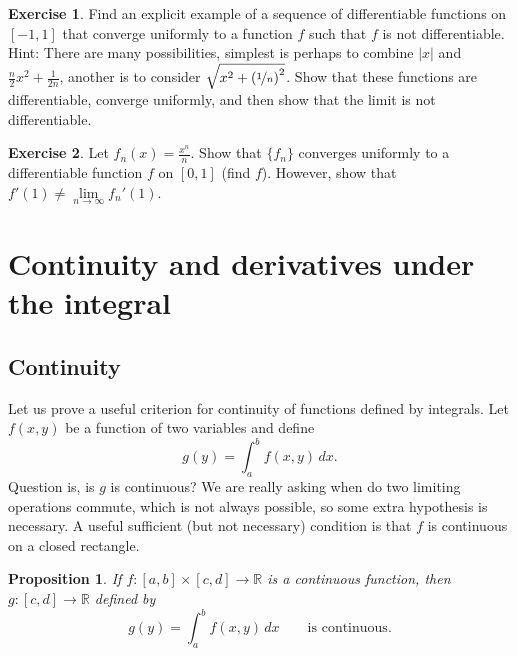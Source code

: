 \documentclass[12pt,openany]{book}
\newcommand{\abs}[1]{\left\lvert {#1} \right\rvert}
\newcommand{\R}{{\mathbb{R}}}
\theoremstyle{plain}
\newtheorem{prop}[thm]{Proposition}
\theoremstyle{remark}
\theoremstyle{definition}
\newenvironment{exbox}{%
    \def\FrameCommand{\vrule width 1pt \relax\hspace {10pt}}%
    \MakeFramed {\advance \hsize -\width \FrameRestore }%
}{%
    \endMakeFramed
}
\theoremstyle{exercise}
\newtheorem{exercise}{Exercise}[section]
\theoremstyle{example}
\begin{document}
\begin{exbox}
\begin{exercise}
Find an explicit example of a sequence of
differentiable functions on $[-1,1]$ that converge uniformly to
a function $f$ such that $f$ is not differentiable.
Hint:
There are many possibilities,
simplest is perhaps to combine $\abs{x}$ and $\frac{n}{2}x^2 +
\frac{1}{2n}$, another is to
consider $\sqrt{x^2+{(\nicefrac{1}{n})}^2}$.  Show that these functions are differentiable,
converge uniformly, and then show that the limit is not differentiable.
\end{exercise}

\begin{exercise}
Let $f_n(x) = \frac{x^n}{n}$.  Show that $\{ f_n \}$ converges uniformly to
a differentiable function $f$ on $[0,1]$ (find $f$).  However, show that
$f'(1) \not= \lim\limits_{n\to\infty} f_n'(1)$.
\end{exercise}
\end{exbox}


\section{Continuity and derivatives under the integral}
\label{sec:contlimitsunderint}

\subsection{Continuity}

Let us prove a useful criterion for
continuity of functions defined by integrals.  Let $f(x,y)$ be a function of two variables and define
\begin{equation*}
g(y) = \int_a^b f(x,y) \,dx .
\end{equation*}
Question is, is $g$ is continuous?
We are really asking when do two limiting operations commute,
which is not always possible, so some extra hypothesis
is necessary.  A useful sufficient (but not
necessary) condition is that $f$ is continuous on a closed rectangle.

\begin{prop} \label{prop:integralcontcont}
If $f \colon [a,b] \times [c,d] \to \R$ is a continuous function,
then $g \colon [c,d] \to \R$ defined by
\begin{equation*}
g(y) = \int_a^b f(x,y) \,dx  \qquad \text{is continuous}.
\end{equation*}
\end{prop}
\end{document}
